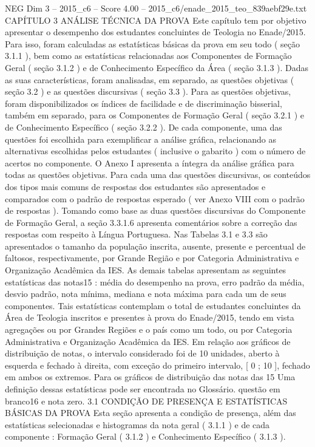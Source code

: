 \begin{textsample}{NEG Dim 3 – 2015\_c6 – Score 4.00 – 2015\_c6/enade\_2015\_teo\_839aebf29e.txt}  \label{ex:f3_neg_074}
CAPÍTULO 3 ANÁLISE TÉCNICA DA PROVA Este capítulo tem por objetivo apresentar o desempenho dos estudantes concluintes de Teologia no Enade/2015.
Para isso, foram calculadas as estatísticas básicas da prova em seu todo ( seção 3.1.1 ), bem como as estatísticas relacionadas aos Componentes de Formação Geral ( seção 3.1.2 ) e de Conhecimento Específico da Área ( seção 3.1.3 ).
Dadas as suas características, foram analisadas, em separado, as questões objetivas ( seção 3.2 ) e as questões discursivas ( seção 3.3 ).
Para as questões objetivas, foram disponibilizados os índices de facilidade e de discriminação bisserial, também em separado, para os Componentes de Formação Geral ( seção 3.2.1 ) e de Conhecimento Específico ( seção 3.2.2 ).
De cada componente, uma das questões foi escolhida para exemplificar a análise gráfica, relacionando as alternativas escolhidas pelos estudantes ( inclusive o gabarito ) com o número de acertos no componente.
O Anexo I apresenta a íntegra da análise gráfica para todas as questões objetivas.
Para cada uma das questões discursivas, os conteúdos dos tipos mais comuns de respostas dos estudantes são apresentados e comparados com o padrão de respostas esperado ( ver Anexo VIII com o padrão de respostas ).
Tomando como base as duas questões discursivas do Componente de Formação Geral, a seção 3.3.1.6 apresenta comentários sobre a correção das respostas com respeito à Língua Portuguesa.
Nas Tabelas 3.1 e 3.3 são apresentados o tamanho da população inscrita, ausente, presente e percentual de faltosos, respectivamente, por Grande Região e por Categoria Administrativa e Organização Acadêmica da IES.
As demais tabelas apresentam as seguintes estatísticas das notas15 : média do desempenho na prova, erro padrão da média, desvio padrão, nota mínima, mediana e nota máxima para cada um de seus componentes.
Tais estatísticas contemplam o total de estudantes concluintes da Área de Teologia inscritos e presentes à prova do Enade/2015, tendo em vista agregações ou por Grandes Regiões e o país como um todo, ou por Categoria Administrativa e Organização Acadêmica da IES.
Em relação aos gráficos de distribuição de notas, o intervalo considerado foi de 10 unidades, aberto à esquerda e fechado à direita, com exceção do primeiro intervalo, [ 0 ; 10 ], fechado em ambos os extremos.
Para os gráficos de distribuição das notas das 15 Uma definição dessas estatísticas pode ser encontrada no Glossário. questão em branco16 e nota zero. 3.1 CONDIÇÃO DE PRESENÇA E ESTATÍSTICAS BÁSICAS DA PROVA Esta seção apresenta a condição de presença, além das estatísticas selecionadas e histogramas da nota geral ( 3.1.1 ) e de cada componente : Formação Geral ( 3.1.2 ) e Conhecimento Específico ( 3.1.3 ).

\end{textsample}
